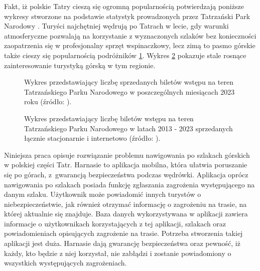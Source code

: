 Fakt, iż polskie Tatry cieszą się ogromną popularnością potwierdzają poniższe wykresy stworzone na podstawie statystyk prowadzonych przez Tatrzański Park Narodowy \cite{tpnstat}. Turyści najchętniej wędrują po Tatrach w lecie, gdy warunki atmosferyczne pozwalają na korzystanie z wyznaczonych szlaków bez konieczności zaopatrzenia się w profesjonalny sprzęt wspinaczkowy, lecz zimą to pasmo górskie także cieszy się popularnością podróżników \ref{sprzedaz2023}. Wykres \ref{sprzedaz} pokazuje stale rosnące zainteresowanie turystyką górską w tym regionie. 

\begin{figure}[H]
    \centering
    \caption{Wykres przedstawiający liczbę sprzedanych biletów wstępu na teren Tatrzańskiego Parku Narodowego w poszczególnych miesiącach 2023 roku (źródło: \cite{tpnstat}).
}
    \label{sprzedaz2023}
\end{figure}

\begin{figure}[H]
    \centering
    \caption{Wykres przedstawiający liczbę biletów wstępu na teren Tatrzańskiego Parku Narodowego w latach 2013 - 2023 sprzedanych łącznie stacjonarnie i internetowo (źródło: \cite{tpnstat}).}
    \label{sprzedaz}
\end{figure}
 
Niniejsza praca opisuje rozwiązanie problemu nawigowania po szlakach górskich w polskiej części Tatr. Harnasie to aplikacja mobilna, która ułatwia poruszanie się po górach, z~gwarancją bezpieczeństwa podczas wędrówki. Aplikacja oprócz nawigowania po szlakach posiada funkcję zgłaszania zagrożenia występującego na danym szlaku. Użytkownik może powiadomić innych turystów o niebezpieczeństwie, jak również otrzymać informację o zagrożeniu na trasie, na której aktualnie się znajduje. Baza danych wykorzystywana w aplikacji zawiera informacje o użytkownikach korzystających z tej aplikacji, szlakach oraz powiadomieniach opisujących zagrożenie na trasie. Potrzeba stworzenia takiej aplikacji jest duża. Harnasie dają gwarancję bezpieczeństwa oraz pewność, iż każdy, kto będzie z niej korzystał, nie zabłądzi i zostanie powiadomiony o wszystkich występujących zagrożeniach.

